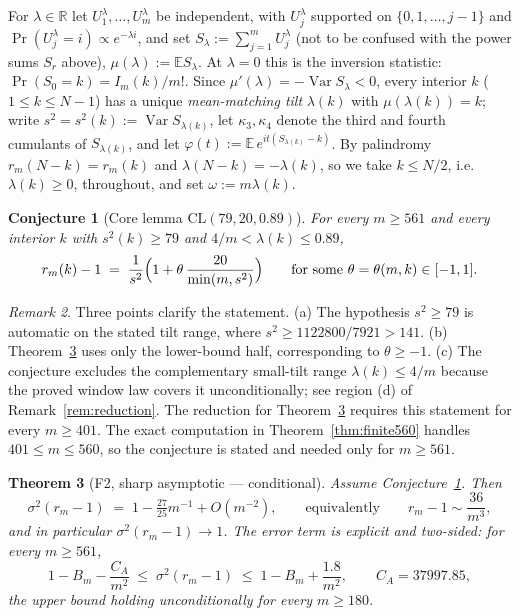 \documentclass[11pt]{amsart}
\theoremstyle{plain}
\newtheorem{theorem}{Theorem}[section]
\newtheorem{conjecture}[theorem]{Conjecture}
\theoremstyle{definition}
\theoremstyle{remark}
\newtheorem{remark}[theorem]{Remark}
\DeclareMathOperator{\Var}{Var}
\begin{document}
For $\lambda\in\mathbb R$ let $U^\lambda_1,\dots,U^\lambda_m$ be
independent, with $U^\lambda_j$ supported on $\{0,1,\dots,j-1\}$ and
$\Pr(U^\lambda_j=i)\propto e^{-\lambda i}$, and set
$S_\lambda:=\sum_{j=1}^m U^\lambda_j$ (not to be confused with the power
sums $S_r$ above), $\mu(\lambda):=\mathbb E S_\lambda$.
At $\lambda=0$ this is the inversion statistic:
$\Pr(S_0=k)=I_m(k)/m!$. Since $\mu'(\lambda)=-\Var S_\lambda<0$, every
interior $k$ ($1\le k\le N-1$) has a unique \emph{mean-matching tilt}
$\lambda(k)$ with $\mu(\lambda(k))=k$; write
$s^2=s^2(k):=\Var S_{\lambda(k)}$, let $\kappa_3,\kappa_4$ denote the
third and fourth cumulants of $S_{\lambda(k)}$, and let
$\varphi(t):=\mathbb E\,e^{it(S_{\lambda(k)}-k)}$. By palindromy
$r_m(N-k)=r_m(k)$ and $\lambda(N-k)=-\lambda(k)$, so we take $k\le N/2$,
i.e.\ $\lambda(k)\ge0$, throughout, and set $\omega:=m\lambda(k)$.

\begin{conjecture}[Core lemma $\mathrm{CL}(79,20,0.89)$]
\label{conj:CL}
For every $m\ge561$ and every interior $k$ with $s^2(k)\ge79$ and
$4/m<\lambda(k)\le0.89$,
\[
r_m(k)-1 \;=\; \frac{1}{s^2}\Bigl(1+\theta\,\frac{20}{\min(m,s^2)}\Bigr)
\qquad\text{for some }\theta=\theta(m,k)\in[-1,1].
\]
\end{conjecture}

\begin{remark}
Three points clarify the statement. (a) The hypothesis $s^2\ge79$ is
automatic on the stated tilt range, where
$s^2\ge1122800/7921>141$. (b) Theorem~\ref{thm:F2} uses only the
lower-bound half, corresponding to $\theta\ge-1$. (c) The conjecture
excludes the complementary small-tilt range $\lambda(k)\le4/m$ because the
proved window law covers it unconditionally; see region (d) of
Remark~\ref{rem:reduction}. The reduction for Theorem~\ref{thm:F2}
requires this statement for every $m\ge401$. The exact computation in
Theorem~\ref{thm:finite560} handles $401\le m\le560$, so the conjecture is
stated and needed only for $m\ge561$.
\end{remark}

\begin{theorem}[F2, sharp asymptotic --- conditional]
\label{thm:F2}
Assume Conjecture~\ref{conj:CL}. Then
\[
\sigma^2(r_m-1) \;=\; 1-\tfrac{27}{25}m^{-1}+O(m^{-2}),
\qquad\text{equivalently}\qquad r_m-1 \sim \frac{36}{m^3},
\]
and in particular $\sigma^2(r_m-1)\to1$. The error term is explicit and
two-sided: for every $m\ge561$,
\[
1-B_m-\frac{C_A}{m^2} \;\le\; \sigma^2(r_m-1) \;\le\; 1-B_m+\frac{1.8}{m^2},
\qquad C_A=37997.85,
\]
the upper bound holding unconditionally for every $m\ge180$.
\end{theorem}
\end{document}
